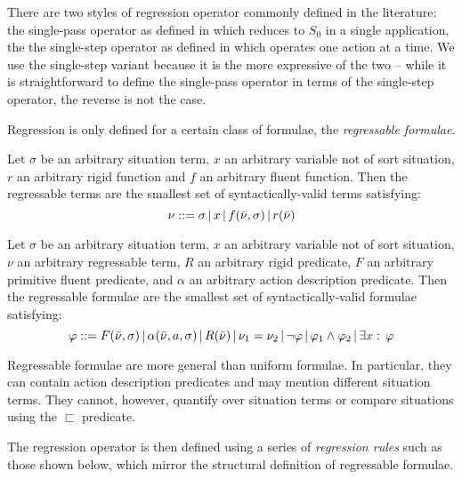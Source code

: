 There are two styles of regression operator commonly defined in the
literature: the single-pass operator as defined in \citep{pirri99contributions_sitcalc}
which reduces to $S_{0}$ in a single application, the the single-step
operator as defined in \citep{scherl03sc_knowledge} which operates
one action at a time. We use the single-step variant because it is
the more expressive of the two -- while it is straightforward to define
the single-pass operator in terms of the single-step operator, the
reverse is not the case.

Regression is only defined for a certain class of formulae, the \emph{regressable
formulae}.

\begin{defnL}
 Let $\sigma$ be an arbitrary situation
term, $x$ an arbitrary variable not of sort situation, $r$ an arbitrary
rigid function and $f$ an arbitrary fluent function. Then the regressable
terms are the smallest set of syntactically-valid terms satisfying:
\[
\nu::=\sigma\,|\, x\,|\, f(\bar{\nu},\sigma)\,|\, r(\bar{\nu})\]

\begin{defnL}
 \label{def:Background:Regressable-Formulae}Let
$\sigma$ be an arbitrary situation term, $x$ an arbitrary variable
not of sort situation, $\nu$ an arbitrary regressable term, $R$
an arbitrary rigid predicate, $F$ an arbitrary primitive fluent predicate,
and $\alpha$ an arbitrary action description predicate. Then the
regressable formulae are the smallest set of syntactically-valid formulae
satisfying: \[
\varphi::=F(\bar{\nu},\sigma)\,|\,\alpha(\bar{\nu},a,\sigma)\,|\, R(\bar{\nu})\,|\,\nu_{1}=\nu_{2}\,|\,\neg\varphi\,|\,\varphi_{1}\wedge\varphi_{2}\,|\,\exists x:\,\varphi\]

\end{defnL}
\end{defnL}
Regressable formulae are more general than uniform formulae. In particular,
they can contain action description predicates and may mention different
situation terms. They cannot, however, quantify over situation terms
or compare situations using the $\sqsubset$ predicate.

The regression operator is then defined using a series of \emph{regression
rules} such as those shown below, which mirror the structural definition
of regressable formulae.

